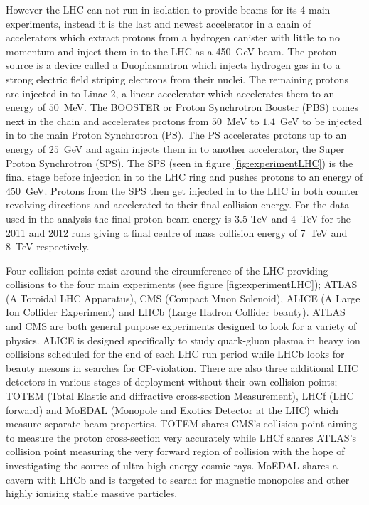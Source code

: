 	However the LHC can not run in isolation to provide beams for its 4 main experiments, instead it is the last and newest accelerator in a chain of accelerators which extract protons from a hydrogen canister with little to no momentum and inject them in to the LHC as a 450~GeV beam.
	The proton source is a device called a Duoplasmatron which injects hydrogen gas in to a strong electric field striping electrons from their nuclei. The remaining protons are injected in to Linac 2, a linear accelerator which accelerates them to an energy of $50$~MeV. The BOOSTER or Proton Synchrotron Booster (PBS) comes next in the chain and accelerates protons from $50$~MeV to $1.4$~GeV to be injected in to the main Proton Synchrotron (PS). The PS accelerates protons up to an energy of $25$~GeV and again injects them in to another accelerator, the Super Proton Synchrotron (SPS). The SPS (seen in figure \ref{fig:experimentLHC}) is the final stage before injection in to the LHC ring and pushes protons to an energy of $450$~GeV. Protons from the SPS then get injected in to the LHC in both counter revolving directions and accelerated to their final collision energy. For the data used in the analysis the final proton beam energy is 3.5 TeV and 4~TeV for the 2011 and 2012 runs giving a final centre of mass collision energy of 7~TeV and 8~TeV respectively.

	Four collision points exist around the circumference of the LHC providing collisions to the four main experiments (see figure \ref{fig:experimentLHC}); ATLAS (A Toroidal LHC Apparatus), CMS (Compact Muon Solenoid), ALICE (A Large Ion Collider Experiment) and LHCb (Large Hadron Collider beauty). ATLAS and CMS are both general purpose experiments designed to look for a variety of physics. ALICE is designed specifically to study quark-gluon plasma in heavy ion collisions scheduled for the end of each LHC run period while LHCb looks for beauty mesons in searches for CP-violation.
	There are also three additional LHC detectors in various stages of deployment without their own collision points; TOTEM (Total Elastic and diffractive cross-section Measurement), LHCf (LHC forward) and MoEDAL (Monopole and Exotics Detector at the LHC) which measure separate beam properties. TOTEM shares CMS's collision point aiming to measure the proton cross-section very accurately while LHCf shares ATLAS's collision point measuring the very forward region of collision with the hope of investigating the source of ultra-high-energy cosmic rays. MoEDAL shares a cavern with LHCb and is targeted to search for magnetic monopoles and other highly ionising stable massive particles.


